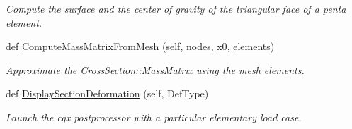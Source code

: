 \begin{DoxyCompactItemize}
\begin{DoxyCompactList}\small\item\em Compute the surface and the center of gravity of the triangular face of a penta element. \end{DoxyCompactList}\item 
def \hyperlink{classgebtaero_1_1_external_mesh_1_1_external_mesh_af2195154db17cc393dab153465e33b59}{Compute\+Mass\+Matrix\+From\+Mesh} (self, \hyperlink{classgebtaero_1_1_external_mesh_1_1_external_mesh_abb7c716a5f2adf2a1f878b1034dcdc57}{nodes}, \hyperlink{classgebtaero_1_1_external_mesh_1_1_external_mesh_acaa3b125cb4f80848007b82426c14ffa}{x0}, \hyperlink{classgebtaero_1_1_external_mesh_1_1_external_mesh_a1a044fbcf39f5f8e7d3e3b98d291010d}{elements})
\begin{DoxyCompactList}\small\item\em Approximate the \hyperlink{classgebtaero_1_1_cross_section_1_1_cross_section_ae9be8649853163b2b4dfdaa3584d9f78}{Cross\+Section\+::\+Mass\+Matrix} using the mesh elements. \end{DoxyCompactList}\item 
def \hyperlink{classgebtaero_1_1_external_mesh_1_1_external_mesh_a6cad952ce309870f33277bb9a89c5ca1}{Display\+Section\+Deformation} (self, Def\+Type)
\begin{DoxyCompactList}\small\item\em Launch the cgx postprocessor with a particular elementary load case. \end{DoxyCompactList}\end{DoxyCompactItemize}
